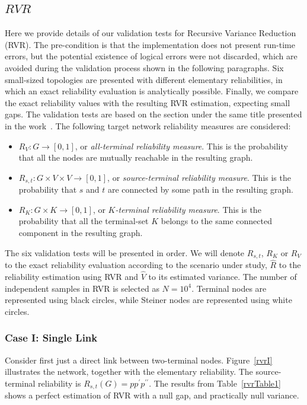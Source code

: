 \subsection{$RVR$}
Here we provide details of our validation tests for Recursive Variance Reduction (RVR). 
The pre-condition is that the implementation does not present run-time errors, but the potential existence of logical errors were not discarded, which are avoided during the validation process shown in the following paragraphs. Six small-sized topologies are presented with different elementary reliabilities, in which an exact reliability evaluation is analytically possible. Finally, we compare the exact reliability values with the resulting RVR estimation, expecting small gaps. The validation tests are based on the section under the same title presented in the work~\cite{4}. The following target network reliability measures are considered:
\begin{itemize}
\item $R_V: G \to [0,1]$, or \emph{all-terminal reliability measure}. This is the probability that all the nodes are mutually reachable in the resulting graph.
\item $R_{s,t}: G \times V \times V \to [0,1]$, or \emph{source-terminal reliability measure}. This is the probability that $s$ and $t$ are connected by some path in the resulting graph.
\item $R_K: G \times K \to [0,1]$, or \emph{$K$-terminal reliability measure}. This is the probability that all the terminal-set $K$ belongs to the same connected component in the resulting graph. 
\end{itemize}

The six validation tests will be presented in order. We will denote $R_{s,t}$, $R_{K}$ or $R_V$ to the 
exact reliability evaluation according to the scenario under study, $\hat{R}$ to the reliability estimation using RVR and $\hat{V}$ to its estimated variance. The number of independent samples in RVR is selected as $N=10^4$. Terminal nodes are represented using black circles, while Steiner nodes are represented using white circles. 

\subsubsection*{Case I: Single Link}
Consider first just a direct link between two-terminal nodes. Figure~\ref{rvrI} illustrates the network, together with the elementary reliability. The source-terminal reliability is $R_{s,t}(G)=p p^{\prime}p^{\prime \prime}$. 
The results from Table~\ref{rvrTable1} shows a perfect estimation of RVR with a null gap, and practically null  variance. 
 
